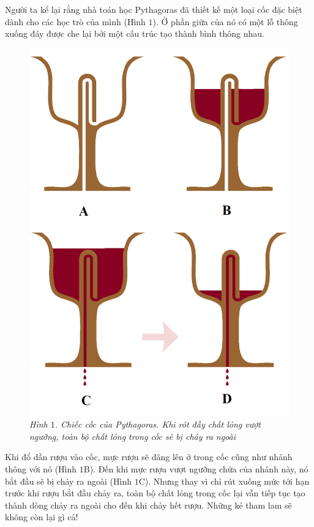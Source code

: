 \begin{multicols}{2}
	Người ta kể lại rằng nhà toán học Pythagoras đã thiết kế một loại cốc đặc biệt dành cho các học trò của mình (Hình $1$). Ở phần giữa của nó có một lỗ thông xuống đáy được che lại bởi một cấu trúc tạo thành bình thông nhau.
	\begin{figure}[H]
		\vspace*{-5pt}
		\centering
		\captionsetup{labelformat= empty, justification=centering}
		\includegraphics[width= 1\linewidth]{1}
		\caption{\small\textit{\color{quantoan}Hình $1$. Chiếc cốc của Pythagoras. Khi rót đầy chất lỏng vượt ngưỡng, toàn bộ chất lỏng trong cốc sẽ bị chảy ra ngoài}}
		\vspace*{-10pt}
	\end{figure}
	Khi đổ dần rượu vào cốc, mực rượu sẽ dâng lên ở trong cốc cũng như nhánh thông với nó (Hình $1$B). Đến khi mực rượu vượt ngưỡng chứa của nhánh này, nó bắt đầu sẽ bị chảy ra ngoài (Hình $1$C). Nhưng thay vì chỉ rút xuống mức tới hạn trước khi rượu bắt đầu chảy ra, toàn bộ chất lỏng trong cốc lại vẫn tiếp tục tạo thành dòng chảy ra ngoài cho đến khi chảy hết rượu. Những kẻ tham lam sẽ không còn lại gì cả!
	

\end{multicols}
